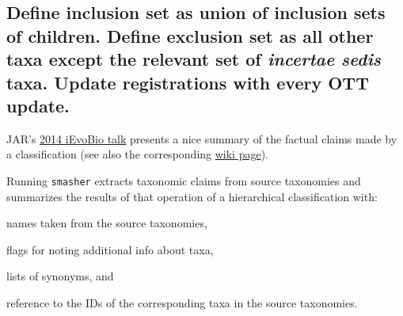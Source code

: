 \documentclass[11pt]{article}
\begin{document}
\subsection{Define inclusion set as union of inclusion sets of children. Define 
exclusion set as all other taxa except the relevant set of {\em incertae sedis} 
taxa.
Update registrations with every OTT update.}
JAR's \href{http://www.slideshare.net/jar375/rees-claimsievobio2014}{2014 iEvoBio talk}
  presents a nice summary of the factual claims made by a classification (see also 
  the corresponding \href{https://github.com/OpenTreeOfLife/reference-taxonomy/wiki/Expressing-phylogenetic-claims}{wiki page}).

Running {\tt smasher} extracts taxonomic claims from source taxonomies and summarizes
  the results of that operation of a hierarchical classification with:
\begin{compactenum}
  \item names taken from the source taxonomies,
  \item flags for noting additional info about taxa,
  \item lists of synonyms, and
  \item reference to the IDs of the corresponding taxa in the source taxonomies.
\end{compactenum}
\end{document}
